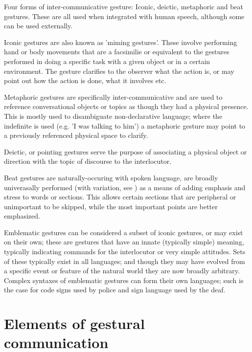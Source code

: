 Four forms of inter-communicative gesture: Iconic, deictic, metaphoric and beat gestures. These are all used when integrated with human speech, although some can be used externally.

Iconic gestures are also known as 'miming gestures'. These involve performing hand or body movements that are a facsimilie or equivalent to the gestures performed in doing a specific task with a given object or in a certain environment. The gesture clarifies to the observer what the action is, or may point out how the action is done, what it involves etc.

Metaphoric gestures are specifically inter-communicative and are used to reference conversational objects or topics as though they had a physical presence. This is mostly used to disambiguate non-declarative language; where the indefinite is used (e.g. 'I was talking to him') a metaphoric gesture may point to a previously referenced physical space to clarify.

Deictic, or pointing gestures serve the purpose of associating a physical object or direction with the topic of discourse to the interlocutor.

Beat gestures are naturally-occuring with spoken language, are broadly univerasally performed (with variation, see \cite{Argyle1988} ) as a means of adding emphasis and stress to words or sections. This allows certain sections that are peripheral or unimportant to be skipped, while the most important points are better emphasized.

Emblematic gestures can be considered a subset of iconic gestures, or may exist on their own; these are gestures that have an innate (typically simple) meaning, typically indicating commands for the interlocutor or very simple attitudes. Sets of these typically exist in all languages; and though they may have evolved from a specific event or feature of the natural world they are now broadly arbitrary. Complex syntaxes of emblematic gestures can form their own languages; such is the case for code signs used by police and sign language used by the deaf.

\section{Elements of gestural communication}
\label{sec:natural-elems}


